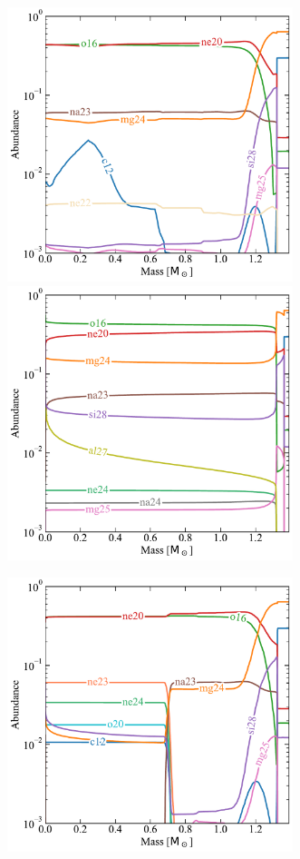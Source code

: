 \documentclass[main.tex]{subfiles}
\begin{document}
\begin{figure}[hbt!]
    \centering
    \includegraphics[height=8cm]{figures/chapter2/abundances/2p5_logRho_9_abun.pdf}\quad
    \includegraphics[height=8cm]{figures/chapter2/abundances/2p5_final_abun.pdf}\par\medskip
    \includegraphics[height=8cm]{figures/chapter2/abundances/2p5_abun_carbon_sup.pdf}

\end{figure}
\end{document}
